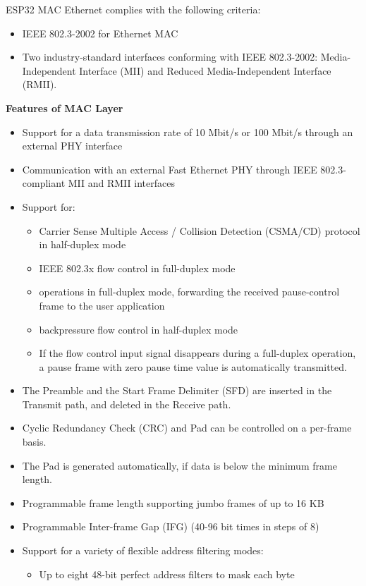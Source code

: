 \documentclass[main\_\_EN.tex]{subfiles}
\begin{document}
ESP32 MAC Ethernet complies with the following criteria:
\begin{itemize}
	\item IEEE 802.3-2002 for Ethernet MAC
	\item Two industry-standard interfaces conforming with IEEE 802.3-2002: Media-Independent Interface (MII) and Reduced Media-Independent Interface (RMII).

\end{itemize}
{\bfseries Features of MAC Layer}
\begin{itemize}
	\item Support for a data transmission rate of 10 Mbit/s or 100 Mbit/s through an external PHY interface
	\item Communication with an external Fast Ethernet PHY through IEEE 802.3-compliant MII and RMII interfaces
	\item Support for: \\
	\begin{itemize}
    	\item Carrier Sense Multiple Access / Collision Detection (CSMA/CD) protocol in half-duplex mode
    	\item IEEE 802.3x flow control in full-duplex mode
    	\item operations in full-duplex mode, forwarding the received pause-control frame to the user application
    	\item backpressure flow control in half-duplex mode
    	\item If the flow control input signal disappears during a full-duplex operation, a pause frame with zero pause time value is automatically transmitted.
	\end{itemize}
	\item The Preamble and the Start Frame Delimiter (SFD) are inserted in the Transmit path, and deleted in the Receive path.
	\item Cyclic Redundancy Check (CRC) and Pad can be controlled on a per-frame basis.
	\item The Pad is generated automatically, if data is below the minimum frame length.
	\item Programmable frame length supporting jumbo frames of up to 16 KB
	\item Programmable Inter-frame Gap (IFG) (40-96 bit times in steps of 8)
	\item Support for a variety of flexible address filtering modes:
    \begin{itemize}
    	\item Up to eight 48-bit perfect address filters to mask each byte

\end{itemize}
\end{itemize}
\end{document}

